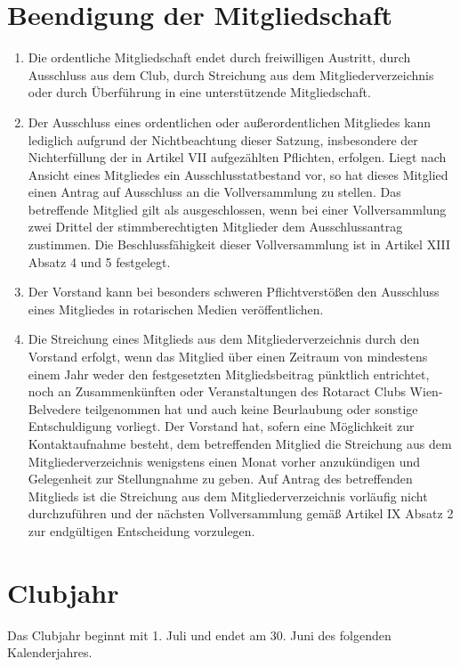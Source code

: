 \documentclass{article}
\begin{document}
\section{Beendigung der Mitgliedschaft}
\begin{enumerate}
    \item Die ordentliche Mitgliedschaft endet durch freiwilligen Austritt, durch Ausschluss aus dem Club, durch Streichung aus dem Mitgliederverzeichnis oder durch Überführung in eine unterstützende Mitgliedschaft.
    \item Der Ausschluss eines ordentlichen oder außerordentlichen Mitgliedes kann lediglich aufgrund der Nichtbeachtung dieser Satzung, insbesondere der Nichterfüllung der in Artikel VII aufgezählten Pflichten, erfolgen. Liegt nach Ansicht eines Mitgliedes ein Ausschlusstatbestand vor, so hat dieses Mitglied einen Antrag auf Ausschluss an die Vollversammlung zu stellen. Das betreffende Mitglied gilt als ausgeschlossen, wenn bei einer Vollversammlung zwei Drittel der stimmberechtigten Mitglieder dem Ausschlussantrag zustimmen. Die Beschlussfähigkeit dieser Vollversammlung ist in Artikel XIII Absatz 4 und 5 festgelegt. 
    \item Der Vorstand kann bei besonders schweren Pflichtverstößen den Ausschluss eines Mitgliedes in rotarischen Medien veröffentlichen. 
    \item Die Streichung eines Mitglieds aus dem Mitgliederverzeichnis durch den Vorstand erfolgt, wenn das Mitglied über einen Zeitraum von mindestens einem Jahr weder den festgesetzten Mitgliedsbeitrag pünktlich entrichtet, noch an Zusammenkünften oder Veranstaltungen des Rotaract Clubs Wien-Belvedere teilgenommen hat und auch keine Beurlaubung oder sonstige Entschuldigung vorliegt. Der Vorstand hat, sofern eine Möglichkeit zur Kontaktaufnahme besteht, dem betreffenden Mitglied die Streichung aus dem Mitgliederverzeichnis wenigstens einen Monat vorher anzukündigen und Gelegenheit zur Stellungnahme zu geben. Auf Antrag des betreffenden Mitglieds ist die Streichung aus dem Mitgliederverzeichnis vorläufig nicht durchzuführen und der nächsten Vollversammlung gemäß Artikel IX Absatz 2 zur endgültigen Entscheidung vorzulegen.
\end{enumerate}

\section{Clubjahr}
Das Clubjahr beginnt mit 1. Juli und endet am 30. Juni des folgenden Kalenderjahres.
\end{document}
